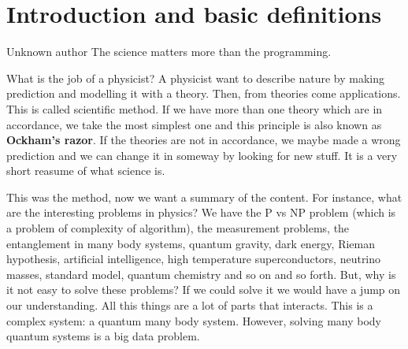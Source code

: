 \documentclass[../main/main.tex]{subfiles}
\begin{document}
\chapter{Introduction and basic definitions}

\begin{chapquote}{Unknown author}
    The science matters more than the programming.
\end{chapquote}



What is the job of a physicist? A physicist want to describe nature by making prediction and modelling it with a theory. Then, from theories come applications. This is called scientific method.
If we have more than one theory which are in accordance, we take the most simplest one and this principle is also known as \textbf{Ockham's razor}.
If the theories are not in accordance, we maybe made a wrong prediction and we can change it in someway by looking for new stuff. It is a very short reasume of what science is.

This was the method, now we want a summary of the content. For instance, what are the interesting problems in physics? We have the P vs NP problem (which is a problem of complexity of algorithm), the measurement problems, the entanglement in many body systems, quantum gravity, dark energy, Rieman hypothesis, artificial intelligence, high temperature superconductors, neutrino masses, standard model, quantum chemistry and so on and so forth.
But, why is it not easy to solve these problems? If we could solve it we would have a jump on our understanding. All this things are a lot of parts that interacts. This is a complex system: a quantum many body system. However, solving many body quantum systems is a big data problem.
\end{document}
